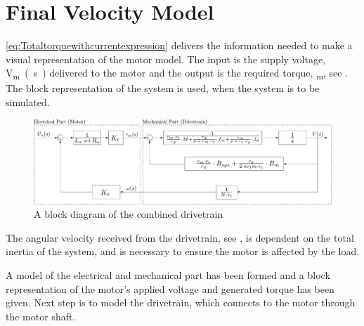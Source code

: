 \section{Final Velocity Model}
\eqref{eq:Totaltorquewithcurrentexpression} delivers the information needed to make a visual representation of the motor model. The input is the supply voltage, \si{V_m(s)} delivered to the motor and the output is the required torque, \si{\tau_m}, see . The block representation of the system is used, when the system is to be simulated.

\begin{figure}[H]
	\centering
	\includegraphics[width=\textwidth]{figures/totalVelocityModelDiagramComplicated.pdf}
	\caption{A block diagram of the combined drivetrain}
	\label{fig:BlockDiagramDrivetrain}
\end{figure}

The angular velocity received from the drivetrain, see , is dependent on the total inertia of the system, and is necessary to ensure the motor is affected by the load.

A model of the electrical and mechanical part has been formed and a block representation of the motor's applied voltage and generated torque has been given. Next step is to model the drivetrain, which connects to the motor through the motor shaft.